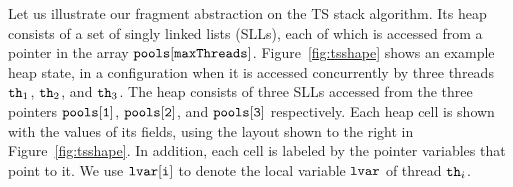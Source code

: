 Let us illustrate our fragment abstraction on the TS stack algorithm.
Its heap consists of a set of singly linked lists (SLLs), each of which
is accessed from a pointer in the array ${\tt pools[maxThreads]}$.
Figure~\ref{fig:tsshape} shows an example heap state,
in a configuration when %
it is accessed concurrently by three threads ${\tt th}_1$, ${\tt th}_2$, and ${\tt th}_3$. The heap consists of three SLLs accessed from the three pointers $\tt pools[1]$, $\tt pools[2]$, and $\tt pools[3]$ respectively. Each heap cell is
shown with the values of its fields, using the layout shown to the right in
Figure~\ref{fig:tsshape}.
In addition, each cell is labeled by the
pointer variables that point to it. We use ${\tt lvar[i]}$ to denote the local
variable ${\tt lvar}$ of thread ${\tt th}_i$.

